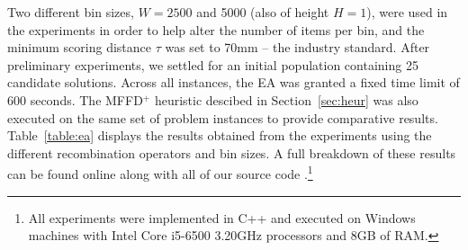 \documentclass[a4paper,11pt,authoryear]{elsarticle}
\begin{document}
Two different bin sizes, $W = 2500$ and 5000 (also of height $H=1$), were used in the experiments in order to help alter the number of items per bin, and the minimum scoring distance $\tau$ was set to 70mm -- the industry standard. After preliminary experiments, we settled for an initial population containing 25 candidate solutions. Across all instances, the EA was granted a fixed time limit of 600 seconds. The MFFD$^+$ heuristic descibed in Section~\ref{sec:heur} was also executed on the same set of problem instances to provide comparative results. Table~\ref{table:ea} displays the results obtained from the experiments using the different recombination operators and bin sizes. A full breakdown of these results can be found online along with all of our source code \citep{hawa2019ea}.\footnote{All experiments were implemented in C++ and executed on Windows machines with Intel Core i5-6500 3.20GHz processors and 8GB of RAM.}
\end{document}
